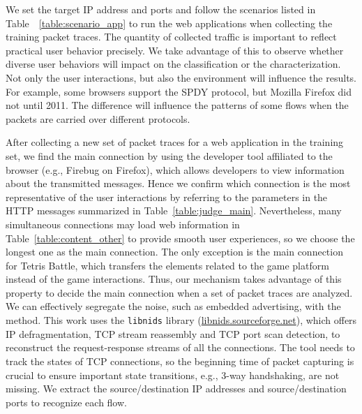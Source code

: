 \documentclass[preprint,12pt]{elsarticle}
\begin{document}
We set the target IP address and ports and follow the scenarios listed in Table~~\ref{table:scenario_app} to run the web applications when collecting the training packet traces. The quantity of collected traffic is important to reflect practical user behavior precisely. We take advantage of this to observe whether diverse user behaviors will impact on the classification or the characterization. Not only the user interactions, but also the environment will influence the results. For example, some browsers support the SPDY protocol, but Mozilla Firefox did not until 2011. The difference will influence the patterns of some flows when the packets are carried over different protocols.

After collecting a new set of packet traces for a web application in the training set, we find the main connection by using the developer tool affiliated to the browser (e.g., Firebug on Firefox), which allows developers to view information about the transmitted messages. Hence we confirm which connection is the most representative of the user interactions by referring to the parameters in the HTTP messages summarized in Table~\ref{table:judge_main}. Nevertheless, many simultaneous connections may load web information in Table~\ref{table:content_other} to provide smooth user experiences, so we choose the longest one as the main connection. The only exception is the main connection for Tetris Battle, which transfers the elements related to the game platform instead of the game interactions. Thus, our mechanism takes advantage of this property to decide the main connection when a set of packet traces are analyzed. We can effectively segregate the noise, such as embedded advertising, with the method. This work uses the \texttt{libnids} library (\url{libnids.sourceforge.net}), which offers IP defragmentation, TCP stream reassembly and TCP port scan detection, to reconstruct the request-response streams of all the connections. The tool needs to track the states of TCP connections, so the beginning time of packet capturing is crucial to ensure important state transitions, e.g., 3-way handshaking, are not missing. We extract the source/destination IP addresses and source/destination ports to recognize each flow.
\end{document}
